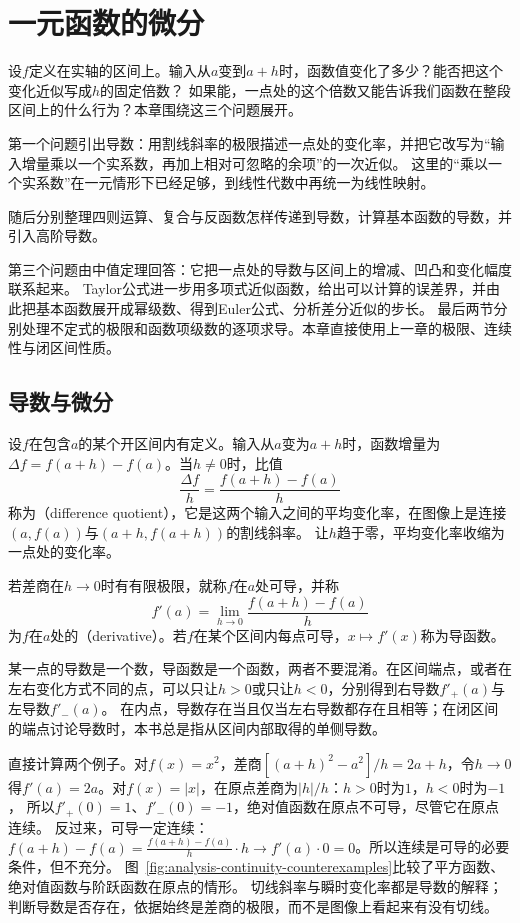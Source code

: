 \chapter{一元函数的微分}
\label{chap:univariate-differentiation}
\label{chap:continuous-functions}

设$f$定义在实轴的区间上。输入从$a$变到$a+h$时，函数值变化了多少？能否把这个变化近似写成$h$的固定倍数？
如果能，一点处的这个倍数又能告诉我们函数在整段区间上的什么行为？本章围绕这三个问题展开。

第一个问题引出导数：用割线斜率的极限描述一点处的变化率，并把它改写为“输入增量乘以一个实系数，再加上相对可忽略的余项”的一次近似。
这里的“乘以一个实系数”在一元情形下已经足够，到线性代数中再统一为线性映射。

随后分别整理四则运算、复合与反函数怎样传递到导数，计算基本函数的导数，并引入高阶导数。

第三个问题由中值定理回答：它把一点处的导数与区间上的增减、凹凸和变化幅度联系起来。
Taylor公式进一步用多项式近似函数，给出可以计算的误差界，并由此把基本函数展开成幂级数、得到Euler公式、分析差分近似的步长。
最后两节分别处理不定式的极限和函数项级数的逐项求导。本章直接使用上一章的极限、连续性与闭区间性质。

\section{导数与微分}
\label{sec:ru-derivatives}
\label{sec:analysis-derivatives-linear-approximation}

设$f$在包含$a$的某个开区间内有定义。输入从$a$变为$a+h$时，函数增量为$\Delta f=f(a+h)-f(a)$。当$h\neq0$时，比值
\[
 \frac{\Delta f}{h}=\frac{f(a+h)-f(a)}h
\]
称为（difference quotient），它是这两个输入之间的平均变化率，在图像上是连接$(a,f(a))$与$(a+h,f(a+h))$的割线斜率。
让$h$趋于零，平均变化率收缩为一点处的变化率。

\begin{definition}[导数]
\label{def:ru-derivative}
若差商在$h\to0$时有有限极限，就称$f$在$a$处可导，并称
\[
 f'(a)=\lim_{h\to0}\frac{f(a+h)-f(a)}h
\]
为$f$在$a$处的（derivative）。若$f$在某个区间内每点可导，$x\mapsto f'(x)$称为导函数。
\end{definition}
某一点的导数是一个数，导函数是一个函数，两者不要混淆。在区间端点，或者在左右变化方式不同的点，可以只让$h>0$或只让$h<0$，分别得到右导数$f'_+(a)$与左导数$f'_-(a)$。
在内点，导数存在当且仅当左右导数都存在且相等；在闭区间的端点讨论导数时，本书总是指从区间内部取得的单侧导数。

直接计算两个例子。对$f(x)=x^2$，差商$[(a+h)^2-a^2]/h=2a+h$，令$h\to0$得$f'(a)=2a$。对$f(x)=|x|$，在原点差商为$|h|/h$：$h>0$时为$1$，$h<0$时为$-1$，
所以$f'_+(0)=1$、$f'_-(0)=-1$，绝对值函数在原点不可导，尽管它在原点连续。
反过来，可导一定连续：$f(a+h)-f(a)=\frac{f(a+h)-f(a)}h\cdot h\to f'(a)\cdot0=0$。所以连续是可导的必要条件，但不充分。
图~\ref{fig:analysis-continuity-counterexamples}比较了平方函数、绝对值函数与阶跃函数在原点的情形。
切线斜率与瞬时变化率都是导数的解释；判断导数是否存在，依据始终是差商的极限，而不是图像上看起来有没有切线。

